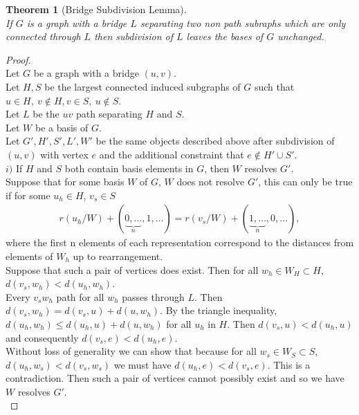 \documentclass[11pt]{amsart}
\theoremstyle{plain}  %
\newtheorem{thm}{Theorem}[section]
\theoremstyle{definition}
\theoremstyle{remark}
\numberwithin{equation}{thm}
\begin{document}
\begin{thm}[Bridge Subdivision Lemma]\ \\
 If $G$ is a graph with a bridge $L$ separating two non path subraphs which are only connected through $L$ 
 then subdivision of $L$ leaves the bases of $G$ unchanged.  
\end{thm}
\begin{proof}$\ $\\
 Let $G$ be a graph with a bridge $(u,v)$.\\
 Let $H, S$ be the largest connected induced subgraphs of $G$ such that\\ $ u\in H,\ v\notin H, v\in S,\ u\notin S$.\\
 Let $L$ be the $uv$ path separating $H$ and $S$.\\
 Let $W$ be a basis of $G$.\\
 Let $G', H', S', L', W'$ be the same objects described above after subdivision of $(u,v)$ with vertex $e$ and the additional constraint that
 $e \notin H' \cup S'$.\\
 
 $i)$%
 If $H$ and $S$ both contain basis elements in $G$, then $W$ resolves $G'$.\\ 
 Suppose that for some basis $W$ of $G$, $W$ does not resolve $G'$, this can only be true if for some $u_h \in H$, $v_s\in S$
\begin{align*}
 r(u_h/W) + (\underbrace{0,\dots}_{n},1,\dots) = r(v_s/W) + (\underbrace{1,\dots}_{n},0,\dots),
\end{align*}
where the first n elements of each representation correspond to the distances from elements of $W_h$ up to rearrangement.\\
Suppose that such a pair of vertices does exist. Then for all $w_h\in W_H \subset H$,\\ $d(v_s, w_h)<d(u_h, w_h)$.\\
Every $v_sw_h$ path for all $w_h$ passes through $L$. Then $d(v_s, w_h)=d(v_s, u)+ d(u, w_h)$. 
By the triangle inequality, $d(u_h, w_h) \leq d(u_h, u) + d(u, w_h)$ for all $u_h$ in $H$.
Then $d(v_s, u)<d(u_h,u)$ and consequently $d(v_s, e)<d(u_h, e)$.\\
Without loss of generality we can show that because for all $w_s\in W_S\subset S$, $d(u_h, w_s)<d(v_s, w_s)$ we must have
$d(u_h, e)<d(v_s,e)$. This is a contradiction. Then such a pair of vertices cannot possibly exist and so we have $W$ resolves $G'$.\\


\end{proof}
\end{document}
